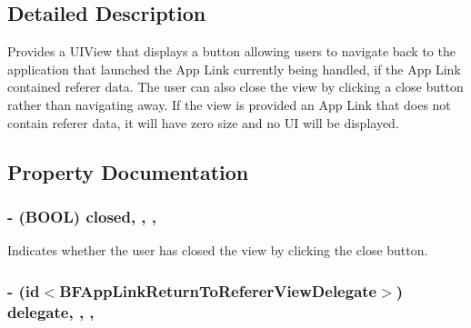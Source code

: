 \subsection{Detailed Description}
Provides a U\-I\-View that displays a button allowing users to navigate back to the application that launched the App Link currently being handled, if the App Link contained referer data. The user can also close the view by clicking a close button rather than navigating away. If the view is provided an App Link that does not contain referer data, it will have zero size and no U\-I will be displayed. 

\subsection{Property Documentation}
\hypertarget{interface_b_f_app_link_return_to_referer_view_acb041d67e8a2f626ae99a788aa8d1da4}{
\subsubsection[{closed}]{\setlength{\rightskip}{0pt plus 5cm}-\/ (B\-O\-O\-L) closed\hspace{0.3cm}{\ttfamily [read]}, {\ttfamily [write]}, {\ttfamily [nonatomic]}, {\ttfamily [assign]}}}\label{interface_b_f_app_link_return_to_referer_view_acb041d67e8a2f626ae99a788aa8d1da4}
Indicates whether the user has closed the view by clicking the close button. \hypertarget{interface_b_f_app_link_return_to_referer_view_aca2022c4be7763b7450d2a39df24b95a}{
\subsubsection[{delegate}]{\setlength{\rightskip}{0pt plus 5cm}-\/ (id$<${\bf B\-F\-App\-Link\-Return\-To\-Referer\-View\-Delegate}$>$) delegate\hspace{0.3cm}{\ttfamily [read]}, {\ttfamily [write]}, {\ttfamily [nonatomic]}, {\ttfamily [weak]}}}\label{interface_b_f_app_link_return_to_referer_view_aca2022c4be7763b7450d2a39df24b95a}
